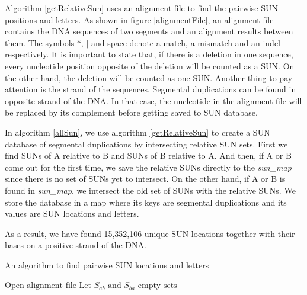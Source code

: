 Algorithm \ref{getRelativeSun} uses an alignment file to find the pairwise SUN positions and letters. As shown in figure \ref{alignmentFile}, an alignment file contains the DNA sequences of two segments and an alignment results between them. The symbols $*$, $|$ and space denote a match, a mismatch and an indel respectively. It is important to state that, if there is a deletion in one sequence, every nucleotide position opposite of the deletion will be counted as a SUN. On the other hand, the deletion will be counted as one SUN. Another thing to pay attention is the strand of the sequences. Segmental duplications can be found in opposite strand of the DNA. In that case, the nucleotide in the alignment file will be replaced by its complement before getting saved to SUN database.

In algorithm \ref{allSun}, we use algorithm \ref{getRelativeSun} to create a SUN database of segmental duplications by intersecting relative SUN sets. First we find SUNs of A relative to B and SUNs of B relative to A. And then, if A or B come out for the first time, we save the relative SUNs directly to the \textit{sun\_map} since there is no set of SUNs yet to intersect. On the other hand, if A or B is found in \textit{sun\_map}, we intersect the old set of SUNs with the relative SUNs. We store the database in a map where its keys are segmental duplications and its values are SUN locations and letters.

As a result, we have found 15,352,106 unique SUN locations together with their bases on a positive strand of the DNA. 

\begin{algorithm}
\caption{An algorithm to find pairwise SUN locations and letters}
\label{getRelativeSun}
\begin{algorithmic}[1]
\State $\text{Open alignment file}$
\State $\text{Let } S_{ab} \text{ and } S_{ba} \text{ empty sets}$
\EndIf
{}
\EndIf
{}
\EndIf
{}
\EndIf
\EndIf
\EndFor
\EndWhile
\EndIf
\EndProcedure
\end{algorithmic}
\end{algorithm}


